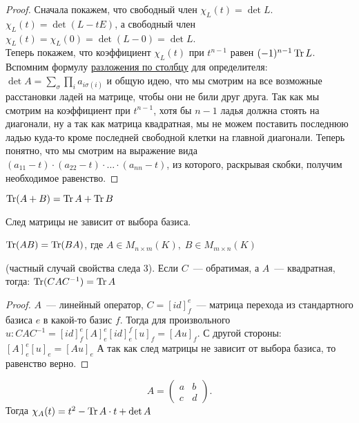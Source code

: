 \begin{proof} Сначала покажем, что свободный член $\chi_L(t) = \det L$. \\ $\chi_L(t) = \det (L - t E)$, а свободный член $\chi_L(t) = \chi_L(0) = \det (L - 0) = \det L$. \\
Теперь покажем, что коэффициент $\chi_L(t)$ при $t^{n - 1}$ равен $(-1)^{n - 1} \operatorname{Tr} L$. \\
Вспомним формулу \hyperref[stm:Формула разложения]{разложения по столбцу} для определителя:
$\det A = \sum\limits_\sigma \prod\limits_i a_{i\sigma(i)}$ и общую идею,
что мы смотрим на все возможные расстановки ладей на матрице, чтобы они не били друг друга.
Так как мы смотрим на коэффициент при $t^{n - 1}$, хотя бы $n - 1$ ладья должна стоять на диагонали,
ну а так как матрица квадратная, мы не можем поставить последнюю ладью куда-то кроме последней свободной клетки на главной диагонали.
Теперь понятно, что мы смотрим на выражение вида 
$(a_{1 1} - t)\cdot(a_{2 2} - t)\cdot \dots \cdot (a_{n n} - t)$,
из которого, раскрывая скобки, получим необходимое равенство.
\end{proof}
\begin{properties}
    \item $\operatorname{Tr} (A + B) = \operatorname{Tr} A + \operatorname{Tr} B$
    \item След матрицы не зависит от выбора базиса.
    \item $\operatorname{Tr} (AB) = \operatorname{Tr} (BA)$, где $A \in M_{n \times m}(K), \; B \in M_{m \times n}(K)$
\end{properties}
\begin{statement}
    (частный случай свойства следа 3). Если $C$~--- обратимая, а $A$~--- квадратная, тогда:
    $\operatorname{Tr}(C A C^{-1}) = \operatorname{Tr} A$
\end{statement}
\begin{proof}
    $A$~--- линейный оператор, $C = [id]^e_f$~--- матрица перехода из стандартного базиса $e$ в какой-то базис $f$.
    Тогда для произвольного $u \colon C A C^{-1} = [id]^e_f[A]_e^e[id]_e^f[u]_f = [Au]_f$. С другой стороны: $[A]_e^e[u]_e = [Au]_e$
    А так как след матрицы не зависит от выбора базиса, то равенство верно.
\end{proof}
\begin{example}
    \[
    A = 
    \begin{pmatrix}
        a&b\\
        c&d
    \end{pmatrix}
    .\] 
    Тогда $\chi_A(t) = t^2 - \operatorname{Tr} A\cdot t + \det A$
\end{example}

